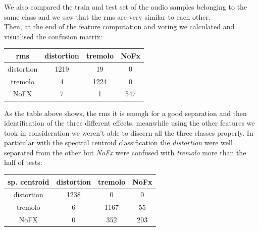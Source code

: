 \documentclass[a4paper,12pt]{report}
\begin{document}
We also compared the train and test set of the audio samples belonging to the same class and we saw that the rms are very similar to each other.\\
Then, at the end of the feature computation and voting we calculated and visualised the confusion matrix:
\begin{center}
\begin{tabular}{|c|c|c|c|}
	\hline
	\textbf{rms}  & distortion & tremolo & NoFx \\
	\hline
	distortion & 1219 & 19 & 0 \\
	\hline
	tremolo & 4 & 1224 & 0 \\
	\hline
	NoFX & 7 & 1 & 547  \\
	\hline
\end{tabular}
\end{center}

As the table above shows, the rms it is enough for a good separation and then identification of the three different effects, meanwhile using the other features we took in consideration we weren't able to discern all the three classes properly. In particular with the spectral centroid classification the \emph{distortion} were well separated from the other but \emph{NoFx} were confused with \emph{tremolo} more than the half of tests:

\begin{center}
\begin{tabular}{|c|c|c|c|}
	\hline
	\textbf{sp. centroid}  & distortion & tremolo & NoFx \\
	\hline
	distortion & 1238 & 0 & 0 \\
	\hline
	tremolo & 6 & 1167 & 55 \\
	\hline
	NoFX & 0 & 352 & 203  \\
	\hline
\end{tabular}
\end{center}
\end{document}
